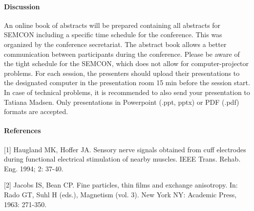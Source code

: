 \documentclass[a4paper]{article}
\begin{document}
\paragraph{Discussion}
An online book of abstracts will be prepared containing all abstracts for SEMCON including a specific time schedule for the conference. This was organized by the conference secretariat. The abstract book allows a better communication between participants during the conference. Please be aware of the tight schedule for the SEMCON, which does not allow for computer-projector problems. For each session, the presenters should upload their presentations to the designated computer in the presentation room 15 min before the session start. In case of technical problems, it is recommended to also send your presentation to Tatiana Madsen. Only presentations in Powerpoint (.ppt, pptx) or PDF (.pdf) formats are accepted.


\paragraph{References}

\begin{description}
\item{[1]} Haugland MK, Hoffer JA. Sensory nerve signals obtained from cuff electrodes during functional electrical stimulation of nearby muscles. IEEE Trans. Rehab. Eng. 1994; 2: 37-40.

\item{[2]} Jacobs IS, Bean CP. Fine particles, thin films and exchange anisotropy. In: Rado GT, Suhl H (eds.), Magnetism (vol. 3). New York NY: Academic Press, 1963: 271-350.
\end{description}
\end{document}
